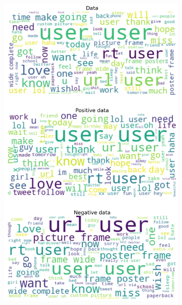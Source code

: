 \documentclass{article}
\begin{document}
\begin{itemize}
  \begin{figure}[H]
    \centering
    \captionsetup{justification=centering}
    \begin{subfigure}[b]{0.24\textwidth}
      \centering
      \includegraphics[width=\textwidth]{chapter-06/section-01-01/04/visualization/1/wordcloud.png}
    \end{subfigure}
    \begin{subfigure}[b]{0.24\textwidth}
      \centering

\end{subfigure}
\end{figure}
\end{itemize}
\end{document}
